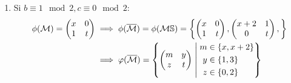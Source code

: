 \documentclass{article}
\newcommand{\suchthat}{\;\ifnum\currentgrouptype=16 \middle\fi|\;}
\begin{document}
\begin{enumerate}
	
		\item Si $b \equiv 1 \mod 2,  c \equiv 0 \mod 2$:
		\begin{align*}
		\phi(\mathcal{M}) = 
		\begin{pmatrix}
		x & 0 \\
		1 & t 
		\end{pmatrix}  & \implies
		\phi(\overline{\mathcal{M}}) = 
		\phi(\mathcal{M}\mathbb{S}) = \left\{
		\begin{pmatrix}
		x & 0 \\
		1 & t 
		\end{pmatrix},
		\begin{pmatrix}
		x+2 & 1 \\
		0 & t 
		\end{pmatrix},
		\right\} \\ & \implies
		\varphi(\overline{\mathcal{M}}) =
		\left\{
		\begin{pmatrix}
		m & y \\
		z & t
		\end{pmatrix} \suchthat 	
		\begin{aligned}
		m &\in \{x, x+2\} \\
		y &\in \{1, 3\} \\
		z &\in \{0, 2\} 
		\end{aligned}					
		\right\} 
		\end{align*}
		

\end{enumerate}
\end{document}
